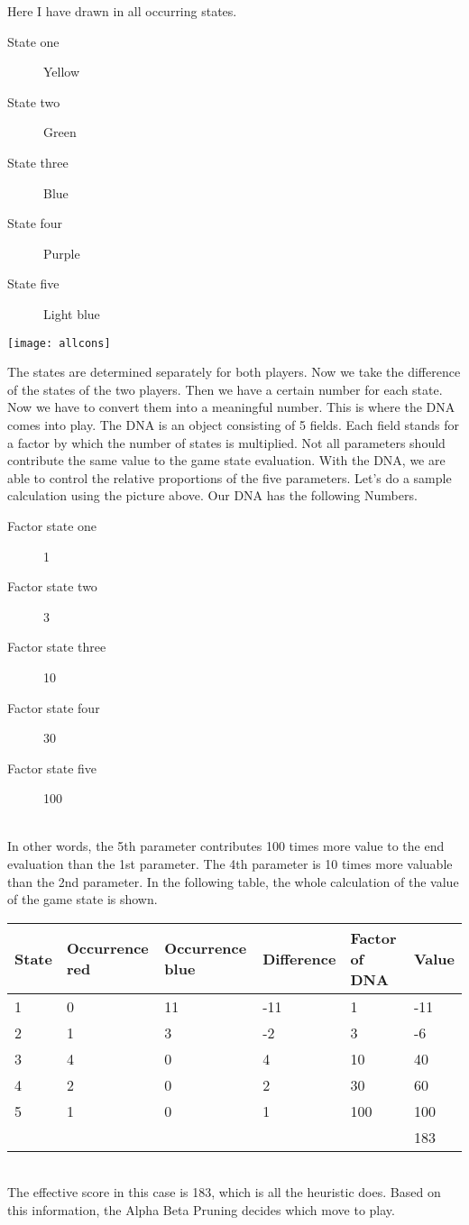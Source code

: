 Here I have drawn in all occurring states.
\begin{description}
\item[State one] Yellow
\item[State two] Green
\item[State three] Blue
\item[State four] Purple
\item[State five] Light blue
\end{description}
\begin{fixedpic}
	\centering
	\texttt{[image: allcons]}
\end{fixedpic}
The states are determined separately for both players. Now we take the difference of the states of the two players. 
Then we have a certain number for each state. Now we have to convert them into a meaningful number. This is where the DNA comes into play. The DNA is an object consisting of 5 fields. Each field stands for a factor by which the number of states is multiplied. Not all parameters should contribute the same value to the game state evaluation. With the DNA, we are able to control the relative proportions of the five parameters. Let's do a sample calculation using the picture above. Our DNA has the following Numbers. 
\begin{description}
\item[Factor state one] 1
\item[Factor state two] 3
\item[Factor state three] 10
\item[Factor state four] 30
\item[Factor state five] 100
\end{description}\\
In other words, the 5th parameter contributes 100 times more value to the end evaluation than the 1st parameter. The 4th parameter is 10 times more valuable than the 2nd parameter. In the following table, the whole calculation of the value of the game state is shown.
\begin{tabularx}{\textwidth}{|X|X|X|X|X|X|}
\hline
State & Occurrence red & Occurrence blue & Difference & Factor of DNA & Value \\\hline
1	& 0	& 11	& -11	& 1 	& -11 \\\hline
2	& 1	& 3 	& -2	& 3 	& -6 \\\hline
3	& 4	& 0 	& 4 	& 10	& 40 \\\hline
4	& 2	& 0 	& 2 	& 30	& 60 \\\hline
5	& 1	& 0 	& 1 	& 100	& 100 \\\hline
\multicolumn{5}{X|}{} & 183 \\\cline{6-6}
\end{tabularx}\\
The effective score in this case is 183, which is all the heuristic does. 
Based on this information, the Alpha Beta Pruning decides which move to play.




